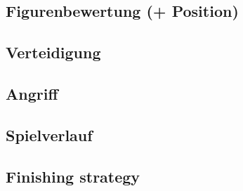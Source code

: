 

\subsection{Figurenbewertung (+ Position)}

\subsection{Verteidigung}

\subsection{Angriff}

\subsection{Spielverlauf}

\subsection{Finishing strategy}
